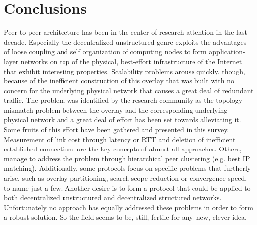 \documentclass[acmcsur]{acmtrans2m}
\begin{document}
\section{Conclusions}
Peer-to-peer architecture has been in the center of research attention in the
last decade. Especially the decentralized unstructured genre exploits the
advantages of loose coupling and self organization of computing nodes to form
application-layer networks on top of the physical, best-effort infrastructure of
the Internet that exhibit interesting properties. Scalability problems arouse
quickly, though, because of the inefficient construction of this overlay that
was built with no concern for the underlying physical network that causes a
great deal of redundant traffic. The problem was identified by the research
community as the topology mismatch problem between the overlay and the
corresponding underlying physical network and a great deal of effort has been
set towards alleviating it. Some fruits of this effort have been gathered and
presented in this survey. Measurement of link cost through latency or RTT and
deletion of inefficient established connections are the key concepts of almost
all approaches. Others, manage to address the problem through hierarchical peer
clustering (e.g. best IP matching). Additionally, some protocols focus on
specific problems that furtherly arise, such as overlay partitioning, search
scope reduction or convergence speed, to name just a few. Another desire is to
form a protocol that could be applied to both decentralized unstructured and
decentralized structured networks. Unfortunately no approach has equally
addressed these problems in order to form a robust solution. So the field seems
to be, still, fertile for any, new, clever idea.


%

\end{document}

